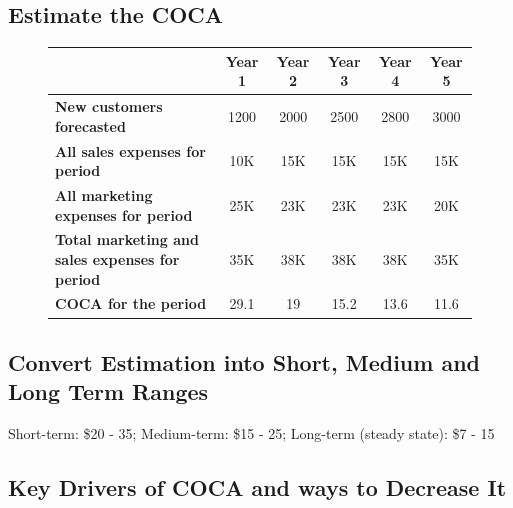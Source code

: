 \documentclass{article}
\begin{document}
        \subsection{Estimate the COCA}

        \begin{figure} [h!]
            \begin{center}
                \begin{tabular}{| p{6cm} | c | c | c | c | c |}
                    \hline
                    & \textbf{Year 1} & \textbf{Year 2} & \textbf{Year 3} & \textbf{Year 4} & \textbf{Year 5}
                    \\ \hline
                    \textbf{New customers forecasted} & 1200 & 2000 & 2500 & 2800 & 3000
                    \\ \hline
                    \textbf{All sales expenses for period} & 10K & 15K & 15K & 15K & 15K 
                    \\ \hline
                    \textbf{All marketing expenses for period} & 25K & 23K & 23K & 23K & 20K
                    \\ \hline
                    \raggedright \textbf{Total marketing and sales expenses for period} & 35K & 38K & 38K & 38K & 35K
                    \\ \hline
                    \textbf{COCA for the period} & 29.1 & 19 & 15.2 & 13.6 & 11.6
                    \\ \hline
                \end{tabular}
            \end{center}
        \end{figure}
    
    \subsection{Convert Estimation into Short, Medium and Long Term Ranges}

        Short-term: \$20 - 35; Medium-term: \$15 - 25; Long-term (steady state): \$7 - 15 

    \subsection{Key Drivers of COCA and ways to Decrease It}
\end{document}
